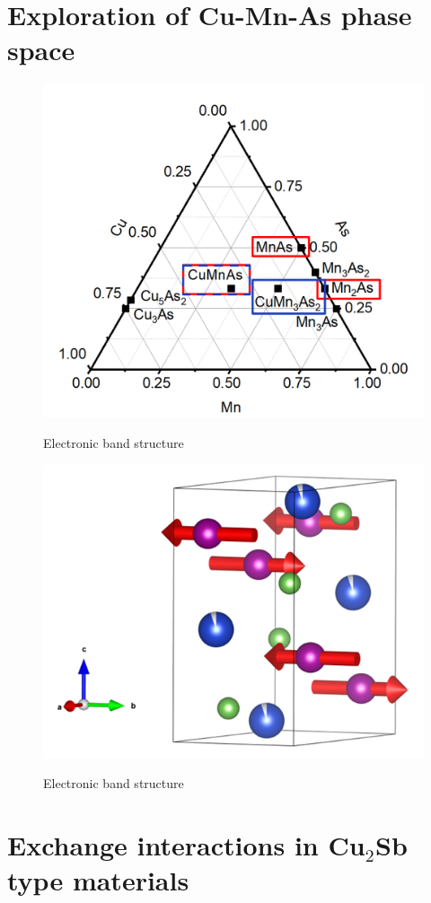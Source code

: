 \documentclass[11pt,edeposit,draftthesis]{uiucthesis2020}
\begin{document}
\begin{mainmatter}
\section{Exploration of Cu-Mn-As phase space}


\begin{figure}
\centering\includegraphics[width=0.8\columnwidth]{figures/ch1/Cu-Mn-As phase diagram.png} \\
\caption{\label{fig:Cu-Mn-As}
Electronic band structure
}
\end{figure}

\begin{figure}
\centering\includegraphics[width=0.5\columnwidth]{figures/ch1/ort-CuMnAs.png} \\
\caption{\label{fig:ort-CuMnAs}
Electronic band structure
}
\end{figure}




\section{Exchange interactions in Cu$_2$Sb type materials}




\end{mainmatter}
\end{document}

